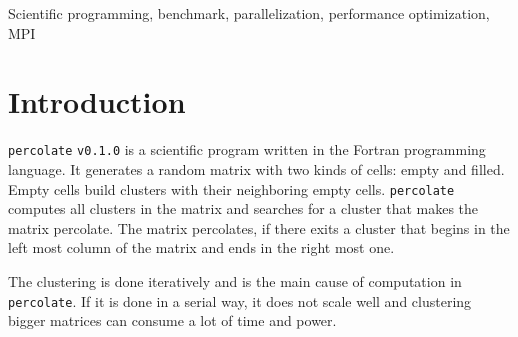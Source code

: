 \documentclass[twoside,11pt]{article}
\title{\titl}
\author{}
\def\perc{\texttt{perco\-late}}
\def\v{\texttt{v0.1.0}}
\begin{document}
\maketitle

\begin{abstract}
This paper describes an optimized version of \perc{} \v{}.
\perc{} is a scientific program, which generates a random
matrix with two kinds of cells: empty and filled.
Empty cells build clusters with their neighboring empty
cells and \perc{} finds clusters that begin at the first
column and end at the last.
If such a cluster exists, the matrix percolates.

\perc{} performs a very costly clustering operation,
wherefore the need for a faster solution arises.

This paper describes the clustering operation and
demonstrates its poor performance, by analyzing its best
case time complexity, before going into detail about how
MPI was used for parallelizing \perc{} and how its
correctness is tested with a regression test suite.
Also, a benchmark is presented, which successfully shows
the performance benefits of the parallel version and its
scalability.
The results of the benchmark are presented and discussed
in this paper, before at last a conclusion is drawn.

\end{abstract}

\begin{keywords}
Scientific programming, benchmark, parallelization,
performance optimization, MPI
\end{keywords}

\section{Introduction} %

\perc{} \v{} is a scientific program written in the Fortran
programming language. It generates a random matrix with two
kinds of cells: empty and filled. Empty cells build
clusters with their neighboring empty cells.
\perc{} computes all clusters in the matrix and searches
for a cluster that makes the matrix percolate.
The matrix percolates, if there exits a cluster that begins
in the left most column of the matrix and ends in the right
most one.

The clustering is done iteratively and is the main cause of
computation in \perc{}.
If it is done in a serial way, it does not
scale well and clustering bigger matrices can consume a
lot of time and power.
\end{document}
